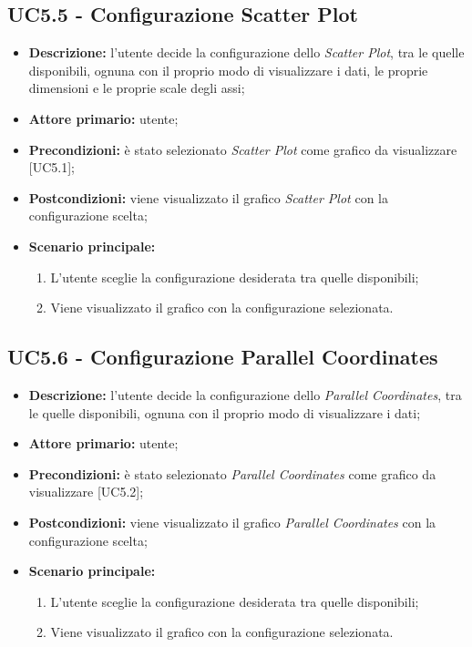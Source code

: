 \subsection{UC5.5 - Configurazione Scatter Plot}
\begin{itemize}
    \item \textbf{Descrizione:} l'utente decide la configurazione dello \textit{Scatter Plot}, tra le quelle disponibili, ognuna con il proprio modo di visualizzare i dati, le proprie dimensioni e le proprie scale degli assi;
    \item \textbf{Attore primario:} utente;
    \item \textbf{Precondizioni:} è stato selezionato \textit{Scatter Plot} come grafico da visualizzare [UC5.1];
    \item \textbf{Postcondizioni:} viene visualizzato il grafico \textit{Scatter Plot} con la configurazione scelta;
    \item \textbf{Scenario principale:}
    \begin{enumerate}
      \item L'utente sceglie la configurazione desiderata tra quelle disponibili;
      \item Viene visualizzato il grafico con la configurazione selezionata.
    \end{enumerate}
\end{itemize}

\subsection{UC5.6 - Configurazione Parallel Coordinates}
\begin{itemize}
    \item \textbf{Descrizione:} l'utente decide la configurazione dello \textit{Parallel Coordinates}, tra le quelle disponibili, ognuna con il proprio modo di visualizzare i dati;
    \item \textbf{Attore primario:} utente;
    \item \textbf{Precondizioni:} è stato selezionato \textit{Parallel Coordinates} come grafico da visualizzare [UC5.2];
    \item \textbf{Postcondizioni:} viene visualizzato il grafico \textit{Parallel Coordinates} con la configurazione scelta;
    \item \textbf{Scenario principale:}
    \begin{enumerate}
      \item L'utente sceglie la configurazione desiderata tra quelle disponibili;
      \item Viene visualizzato il grafico con la configurazione selezionata.
    \end{enumerate}
\end{itemize}

